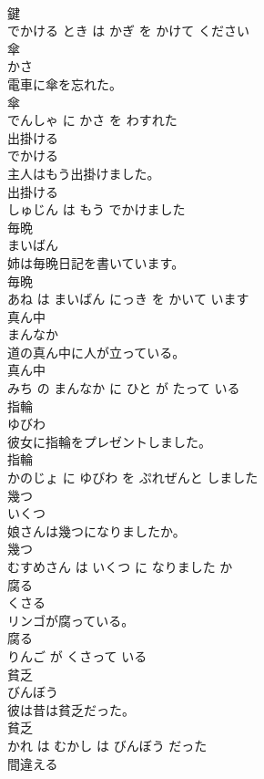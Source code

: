 \documentclass[8pt]{extreport}
\begin{document}
\begin{CJK}{UTF8}{min}
\\	鍵 
\\	でかける とき は かぎ を かけて ください			
\\	傘	
\\	かさ			
\\	電車に傘を忘れた。	
\\	傘 
\\	でんしゃ に かさ を わすれた			
\\	出掛ける	
\\	でかける			
\\	主人はもう出掛けました。	
\\	出掛ける 
\\	しゅじん は もう でかけました			
\\	毎晩	
\\	まいばん			
\\	姉は毎晩日記を書いています。	
\\	毎晩 
\\	あね は まいばん にっき を かいて います			
\\	真ん中	
\\	まんなか			
\\	道の真ん中に人が立っている。	
\\	真ん中 
\\	みち の まんなか に ひと が たって いる			
\\	指輪	
\\	ゆびわ			
\\	彼女に指輪をプレゼントしました。	
\\	指輪 
\\	かのじょ に ゆびわ を ぷれぜんと しました			
\\	幾つ	
\\	いくつ			
\\	娘さんは幾つになりましたか。	
\\	幾つ 
\\	むすめさん は いくつ に なりました か			
\\	腐る	
\\	くさる			
\\	リンゴが腐っている。	
\\	腐る 
\\	りんご が くさって いる			
\\	貧乏	
\\	びんぼう			
\\	彼は昔は貧乏だった。	
\\	貧乏 
\\	かれ は むかし は びんぼう だった			
\\	間違える	

\end{CJK}
\end{document}
